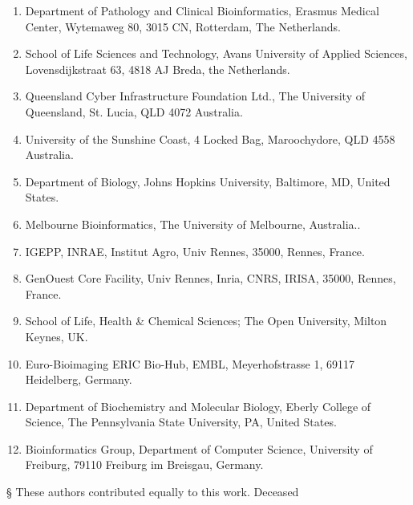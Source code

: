\begin{enumerate}
\itemsep-0.5em
\item Department of Pathology and Clinical Bioinformatics, Erasmus Medical Center, Wytemaweg 80, 3015 CN, Rotterdam, The Netherlands.\label{tiaas-affil:1}
\item School of Life Sciences and Technology, Avans University of Applied Sciences, Lovensdijkstraat 63, 4818 AJ Breda, the Netherlands.\label{tiaas-affil:2}
\item Queensland Cyber Infrastructure Foundation Ltd., The University of Queensland, St. Lucia, QLD 4072 Australia.\label{tiaas-affil:3}
\item University of the Sunshine Coast, 4 Locked Bag, Maroochydore, QLD 4558 Australia.\label{tiaas-affil:4}
\item Department of Biology, Johns Hopkins University, Baltimore, MD, United States.\label{tiaas-affil:5}
\item Melbourne Bioinformatics, The University of Melbourne, Australia..\label{tiaas-affil:6}
\item IGEPP, INRAE, Institut Agro, Univ Rennes, 35000, Rennes, France.\label{tiaas-affil:7}
\item GenOuest Core Facility, Univ Rennes, Inria, CNRS, IRISA, 35000, Rennes, France.\label{tiaas-affil:8}
\item School of Life, Health \& Chemical Sciences; The Open University, Milton Keynes, UK.\label{tiaas-affil:9}
\item Euro-Bioimaging ERIC Bio-Hub, EMBL, Meyerhofstrasse 1, 69117 Heidelberg, Germany.\label{tiaas-affil:10}
\item Department of Biochemistry and Molecular Biology, Eberly College of Science, The Pennsylvania State University, PA, United States.\label{tiaas-affil:11}
\item Bioinformatics Group, Department of Computer Science, University of Freiburg, 79110 Freiburg im Breisgau, Germany.\label{tiaas-affil:12}
\end{enumerate}


§ These authors contributed equally to this work.
\dag Deceased


